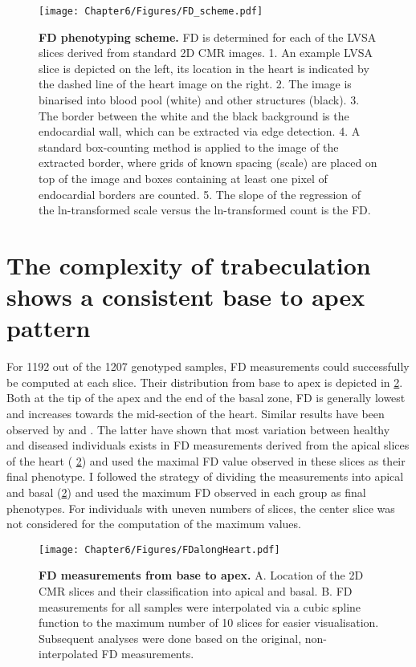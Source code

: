 \begin{figure}[hbtp]
	\centering
	\texttt{[image: Chapter6/Figures/FD\_scheme.pdf]}
	\caption[\textbf{FD phenotyping scheme. }Adapted from \citep{Captur2013}]{\textbf{FD phenotyping scheme. }FD is determined for each of the LVSA slices derived from standard 2D CMR images. 1. An example LVSA slice is depicted on the left, its location in the heart is indicated by the dashed line of the heart image on the right. 2. The image is binarised into blood pool (white) and other structures (black). 3. The border between the white and the black background is the endocardial wall, which can be extracted via edge detection. 4. A standard box-counting method is applied to the image of the extracted border, where grids of known spacing (scale) are placed on top of the image and boxes containing at least one pixel of endocardial borders are counted. 5. The slope of the regression of the ln-transformed scale versus the ln-transformed count is the FD.   } 
	 	\label{fig:scheme-fd}
\end{figure}

\section{The complexity of trabeculation shows a consistent base to apex pattern}
For \num{1192} out of the \num{1207} genotyped samples, FD measurements could successfully be computed at each slice. Their distribution from base to apex is depicted in \cref{fig:perslice-fd}. Both at the tip of the apex and the end of the basal zone, FD is generally lowest and increases towards the mid-section of the heart. Similar results have been observed by \citep{Kawell2012} and \citep{Captur2014}. The latter have shown that most variation between healthy and diseased individuals exists in FD measurements derived from the apical slices of the heart ( \cref{fig:perslice-fd}) and used the maximal FD value observed in these slices as their final phenotype. I followed the strategy of dividing the measurements into apical and basal (\cref{fig:perslice-fd}) and used the maximum FD observed in each group as final phenotypes. For individuals with uneven numbers of slices, the center slice was not considered for the computation of the maximum values.

\begin{figure}[hbtp]
	\centering
	\texttt{[image: Chapter6/Figures/FDalongHeart.pdf]}
	\caption[\textbf{FD measurements from base to apex. }]{\textbf{FD measurements from base to apex. } A. Location of the 2D CMR slices and their classification into apical and basal. B. FD measurements for all samples were interpolated via a cubic spline function to the maximum number of \num{10} slices for easier visualisation. Subsequent analyses were done based on the original, non-interpolated FD measurements.} 
	 	\label{fig:perslice-fd}
\end{figure}


